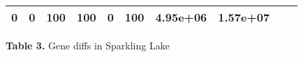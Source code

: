 \documentclass[]{article}
\begin{document}
\begin{longtable}[]{@{}lccccccccc@{}}
\begin{minipage}[t]{0.08\columnwidth}
0\strut
\end{minipage} & \begin{minipage}[t]{0.08\columnwidth}\centering\strut
0\strut
\end{minipage} & \begin{minipage}[t]{0.08\columnwidth}\centering\strut
100\strut
\end{minipage} & \begin{minipage}[t]{0.08\columnwidth}\centering\strut
100\strut
\end{minipage} & \begin{minipage}[t]{0.08\columnwidth}\centering\strut
0\strut
\end{minipage} & \begin{minipage}[t]{0.08\columnwidth}\centering\strut
100\strut
\end{minipage} & \begin{minipage}[t]{0.08\columnwidth}\centering\strut
4.95e+06\strut
\end{minipage} & \begin{minipage}[t]{0.08\columnwidth}\centering\strut
1.57e+07\strut
\end{minipage}\tabularnewline
\bottomrule
\end{longtable}

\textbf{Table 3.} Gene diffs in Sparkling Lake
\end{document}
